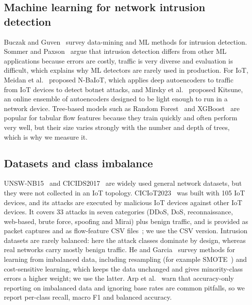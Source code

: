 \documentclass[runningheads]{llncs}
\begin{document}
\subsection{Machine learning for network intrusion detection}
Buczak and Guven~\cite{buczak2016} survey data-mining and ML methods for intrusion detection. Sommer and Paxson~\cite{sommer2010} argue that intrusion detection differs from other ML applications because errors are costly, traffic is very diverse and evaluation is difficult, which explains why ML detectors are rarely used in production. For IoT, Meidan et al.~\cite{meidan2018} proposed N-BaIoT, which applies deep autoencoders to traffic from IoT devices to detect botnet attacks, and Mirsky et al.~\cite{mirsky2018} proposed Kitsune, an online ensemble of autoencoders designed to be light enough to run in a network device. Tree-based models such as Random Forest~\cite{breiman2001} and XGBoost~\cite{chen2016} are popular for tabular flow features because they train quickly and often perform very well, but their size varies strongly with the number and depth of trees, which is why we measure it.

\subsection{Datasets and class imbalance}
UNSW-NB15~\cite{moustafa2015} and CICIDS2017~\cite{sharafaldin2018} are widely used general network datasets, but they were not collected in an IoT topology. CICIoT2023~\cite{neto2023} was built with 105 IoT devices, and its attacks are executed by malicious IoT devices against other IoT devices. It covers 33 attacks in seven categories (DDoS, DoS, reconnaissance, web-based, brute force, spoofing and Mirai) plus benign traffic, and is provided as packet captures and as flow-feature CSV files~\cite{cic}; we use the CSV version. Intrusion datasets are rarely balanced: here the attack classes dominate by design, whereas real networks carry mostly benign traffic. He and Garcia~\cite{he2009} survey methods for learning from imbalanced data, including resampling (for example SMOTE~\cite{chawla2002}) and cost-sensitive learning, which keeps the data unchanged and gives minority-class errors a higher weight; we use the latter. Arp et al.~\cite{arp2022} warn that accuracy-only reporting on imbalanced data and ignoring base rates are common pitfalls, so we report per-class recall, macro F1 and balanced accuracy.
\end{document}
